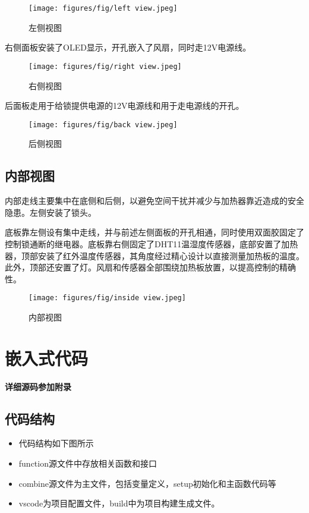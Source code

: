 \documentclass[12pt,hyperref,a4paper,UTF8]{ctexart}
\begin{document}
\begin{figure}[H]
    \centering
    \texttt{[image: figures/fig/left view.jpeg]}
    \caption{左侧视图}
    \label{fig:enter-label}
\end{figure}

右侧面板安装了OLED显示，开孔嵌入了风扇，同时走12V电源线。
\begin{figure}[H]
    \centering
    \texttt{[image: figures/fig/right view.jpeg]}
    \caption{右侧视图}
    \label{fig:enter-label}
\end{figure}
后面板走用于给锁提供电源的12V电源线和用于走电源线的开孔。

\begin{figure}[H]
    \centering
    \texttt{[image: figures/fig/back view.jpeg]}
    \caption{后侧视图}
    \label{fig:enter-label}
\end{figure}

\subsection*{内部视图}
内部走线主要集中在底侧和后侧，以避免空间干扰并减少与加热器靠近造成的安全隐患。左侧安装了锁头。

底板靠左侧设有集中走线，并与前述左侧面板的开孔相通，同时使用双面胶固定了控制锁通断的继电器。底板靠右侧固定了DHT11温湿度传感器，底部安置了加热器，顶部安装了红外温度传感器，其角度经过精心设计以直接测量加热板的温度。此外，顶部还安置了灯。风扇和传感器全部围绕加热板放置，以提高控制的精确性。

\begin{figure}[H]
    \centering
    \texttt{[image: figures/fig/inside view.jpeg]}
    \caption{内部视图}
    \label{fig:enter-label}
\end{figure}

\newpage



\section{嵌入式代码}
\textbf{\large 详细源码参加附录}

\subsection*{代码结构}

\begin{itemize}
  \item 代码结构如下图所示
  \item function源文件中存放相关函数和接口
  \item combine源文件为主文件，包括变量定义，setup初始化和主函数代码等
  \item vscode为项目配置文件，build中为项目构建生成文件。
\end{itemize}
\end{document}
